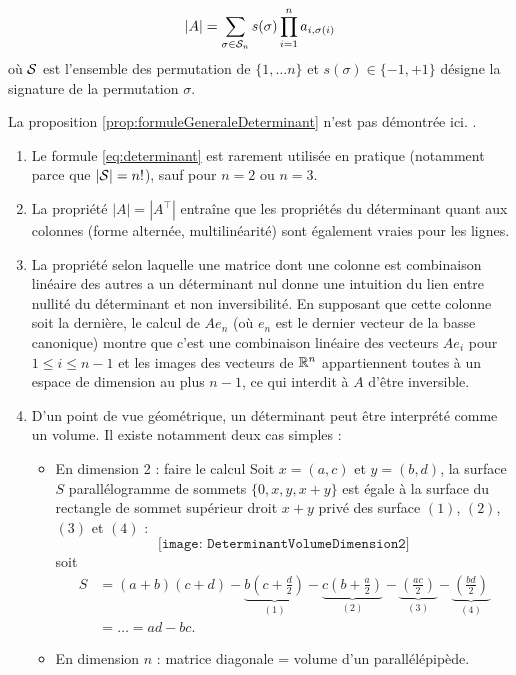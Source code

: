\begin{proposition} \label{prop:formuleGeneraleDeterminant}
  \begin{equation} \label{eq:determinant}
    |A| = \sum_{\sigma \in \mathcal{S}_n} s(\sigma) \prod_{i=1}^n a_{i, \sigma(i)} 
    \end{equation}
    où $\mathcal{S}$ est l'ensemble des permutation de $\{1, \dots n\}$ et $s(\sigma) \in \{-1, +1\}$ désigne la signature de la permutation $\sigma$. 
\end{proposition}

La proposition \ref{prop:formuleGeneraleDeterminant} n'est pas démontrée ici. \eproof.

\remarks 
\begin{enumerate}
 \item Le formule \eqref{eq:determinant} est rarement utilisée en pratique (notamment parce que $|\mathcal{S}| = n!$), sauf pour $n=2$ ou $n=3$.
 \item La propriété $|A| = |A^\top|$ entraîne que les propriétés du déterminant quant aux colonnes (forme alternée, multilinéarité) sont également vraies pour les lignes. 
 \item La propriété selon laquelle une matrice dont une colonne est combinaison linéaire des autres a un déterminant nul donne une intuition du lien entre nullité du déterminant et non inversibilité. En supposant que cette colonne soit la dernière, le calcul de $A e_n$ (où $e_n$ est le dernier vecteur de la basse canonique) montre que c'est une combinaison linéaire des vecteurs $A e_i$ pour $1 \leq i \leq n-1$ et les images des vecteurs de $\mathbb{R}^n$ appartiennent toutes à un espace de dimension au plus $n-1$, ce qui interdit à $A$ d'être inversible.
  \item D'un point de vue géométrique, un déterminant peut être interprété comme un volume. Il existe notamment deux cas simples :
  \begin{itemize}
  \item En dimension 2 : faire le calcul
    Soit $x = (a, c)$ et $y = (b, d)$, la surface $S$ parallélogramme de sommets $\{0, x, y, x+y\}$ est égale à la surface du rectangle de sommet supérieur droit $x+y$ privé des surface $(1)$, $(2)$, $(3)$ et $(4)$ : 
    $$
    \texttt{[image: DeterminantVolumeDimension2]}
    $$
    soit
    \begin{align*}
      S 
      & = (a+b)(c+d) 
      - \underset{(1)}{\underbrace{b\left(c + \frac{d}2\right)}} 
      - \underset{(2)}{\underbrace{c\left(b + \frac{a}2\right)}} 
      - \underset{(3)}{\underbrace{\left(\frac{ac}2\right)}} 
      - \underset{(4)}{\underbrace{\left(\frac{bd}2\right)}} \\
      & = \dots = ad - bc.
    \end{align*}
  \item En dimension $n$ : matrice diagonale = volume d'un parallélépipède.
  \end{itemize}
\end{enumerate}

